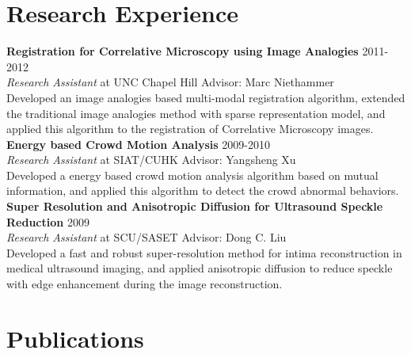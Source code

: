\documentclass[line,margin]{res}
\begin{document}
\begin{resume}
 
\section{\sc Research Experience} 
\smallskip

\textbf{Registration for Correlative Microscopy using Image Analogies} \hfill      2011-2012 \\
\textit{ Research Assistant} at UNC Chapel Hill  \hfill {Advisor: Marc Niethammer}\\
Developed an image analogies based multi-modal registration algorithm, extended the traditional image analogies method with sparse representation model, and applied this algorithm to the registration of Correlative Microscopy images.
\smallskip \\
\textbf{Energy based Crowd Motion Analysis} \hfill      2009-2010 \\
\textit{Research Assistant} at SIAT/CUHK \hfill {Advisor: Yangsheng Xu}\\
Developed a energy based crowd motion analysis algorithm based on mutual information, and
applied this algorithm to detect the crowd abnormal behaviors.
\smallskip \\
\textbf{Super Resolution and Anisotropic Diffusion for Ultrasound Speckle Reduction} \hfill      2009 \\
\textit{Research Assistant} at SCU/SASET \hfill {Advisor: Dong C. Liu}\\
Developed a fast and robust super-resolution method for intima reconstruction in medical
ultrasound imaging, and applied anisotropic diffusion to reduce speckle with edge enhancement during the image reconstruction.

\section{\sc Publications}  


\end{resume}
\end{document}
